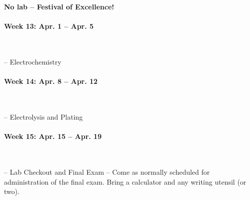 \documentclass[12pt, letterpaper]{article}
\begin{document}
\textbf{No lab -- Festival of Excellence!}

\paragraph{Week 13: Apr. 1 -- Apr. 5}~

-- Electrochemistry

\paragraph{Week 14: Apr. 8 -- Apr. 12}~

-- Electrolysis and Plating

\paragraph{Week 15: Apr. 15 -- Apr. 19}~

-- Lab Checkout and Final Exam -- Come as normally scheduled for administration of the final exam. Bring a calculator and any writing utensil (or two).
\end{document}
